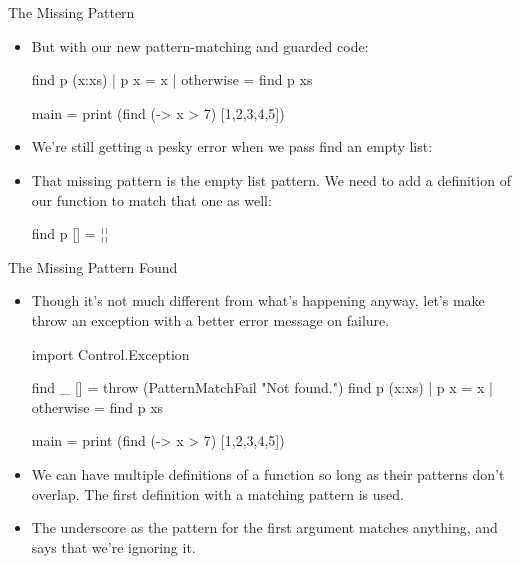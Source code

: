 \documentclass[xcolor=dvipsnames]{beamer}          %
\newcommand{\lO}[1]{\color{Black}{#1}}
\newcommand{\lS}[1]{\color{Green}{#1}}
\begin{document}
\begin{frame}[fragile]{The Missing Pattern}
\begin{itemize}
    \item But with our new pattern-matching and guarded code:
        \begin{hlisting}
            find p (x:xs) | p x       = x
                          | otherwise = find p xs

            main = print (find (\x -> x > 7) [1,2,3,4,5])
        \end{hlisting}
    \item We're still getting a pesky error when we pass find an empty list:
    \item That missing pattern is the empty list pattern. We need to
        add a definition of our function to match that one as well:
        \begin{hlisting}
            find p [] = ¦\lO{...}¦
        \end{hlisting}
\end{itemize}
\end{frame}

\begin{frame}[fragile]{The Missing Pattern Found}
\begin{itemize}
    \item Though it's not much different from what's happening anyway,
        let's make  throw an exception with a better error
        message on failure.
        \begin{hlisting}
            import Control.Exception

            find _ [] = throw (PatternMatchFail "Not found.")
            find p (x:xs) | p x       = x
                          | otherwise = find p xs

            main = print (find (\x -> x > 7) [1,2,3,4,5])
        \end{hlisting}
    \item We can have multiple definitions of a function so long as their
        patterns don't overlap. The first definition with a matching
        pattern is used.
    \item The underscore as the pattern for the first argument matches
        anything, and says that we're ignoring it.
\end{itemize}
\end{frame}
\end{document}
